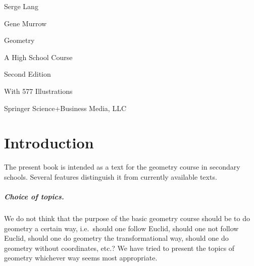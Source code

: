 \documentclass[12pt]{book} %
\begin{document}
	\frontmatter
	
	\begin{titlepage}
		\thispagestyle{empty}
		\begin{center}
			\vspace*{2cm}
			
			{\Large Serge Lang\par}
			\vspace{0.2cm}
			{\Large Gene Murrow\par}
			
			\vspace{2.5cm}
			
			{\Huge Geometry\par}
			\vspace{0.4cm}
			{\LARGE A High School Course\par}
			
			\vspace{1.5cm}
			
			{\Large Second Edition\par}
			
			\vspace{1.5cm}
			
			{\large With 577 Illustrations\par}
			
			\vfill
			
			{\Large Springer Science+Business Media, LLC\par}
		\end{center}
	\end{titlepage}
	
	\clearpage
	\thispagestyle{empty}
	
	
	\tableofcontents
	
	\chapter*{Introduction}

The present book is intended as a text for the geometry course in secondary schools. Several features distinguish it from currently available texts.

\paragraph{Choice of topics.}
We do not think that the purpose of the basic geometry course should be to do geometry a certain way, i.e.\ should one follow Euclid, should one not follow Euclid, should one do geometry the transformational way, should one do geometry without coordinates, etc.? We have tried to present the topics of geometry whichever way seems most appropriate.
\end{document}

